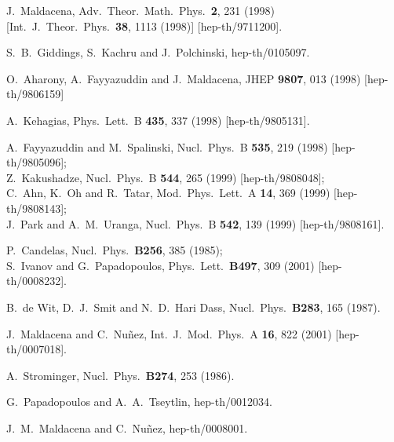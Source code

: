 \documentclass[a4paper,12pt]{article}
\renewcommand{\=}[1]{\bar{#1}}
\begin{document}
\begin{thebibliography}{10}
\baselineskip=15pt

J.~Maldacena,
Adv.\ Theor.\ Math.\ Phys.\  {\bf 2}, 231 (1998)
[Int.\ J.\ Theor.\ Phys.\  {\bf 38}, 1113 (1998)]
[hep-th/9711200].

S.~B.~Giddings, S.~Kachru and J.~Polchinski,
hep-th/0105097.

O.~Aharony, A.~Fayyazuddin and J.~Maldacena,
JHEP {\bf 9807}, 013 (1998)
[hep-th/9806159]

A.~Kehagias,
Phys.\ Lett.\ B {\bf 435}, 337 (1998)
[hep-th/9805131].

A.~Fayyazuddin and M.~Spalinski,
Nucl.\ Phys.\ B {\bf 535}, 219 (1998)
[hep-th/9805096];\\
Z.~Kakushadze,
Nucl.\ Phys.\ B {\bf 544}, 265 (1999)
[hep-th/9808048];\\
C.~Ahn, K.~Oh and R.~Tatar,
Mod.\ Phys.\ Lett.\ A {\bf 14}, 369 (1999)
[hep-th/9808143];\\
J.~Park and A.~M.~Uranga,
Nucl.\ Phys.\ B {\bf 542}, 139 (1999)
[hep-th/9808161].

P.~Candelas,
Nucl.\ Phys.\ {\bf B256}, 385 (1985);\\
S.~Ivanov and G.~Papadopoulos,
Phys.\ Lett.\ {\bf B497}, 309 (2001)
[hep-th/0008232].

B.~de Wit, D.~J.~Smit and N.~D.~Hari Dass,
Nucl.\ Phys.\ {\bf B283}, 165 (1987).

J.~Maldacena and C.~Nu\~nez,
Int.\ J.\ Mod.\ Phys.\ A {\bf 16}, 822 (2001)
[hep-th/0007018].

A.~Strominger,
Nucl.\ Phys.\ {\bf B274}, 253 (1986).

G.~Papadopoulos and A.~A.~Tseytlin,
hep-th/0012034.

J.~M.~Maldacena and C.~Nu\~nez,
hep-th/0008001.


\end{thebibliography}
\end{document}
